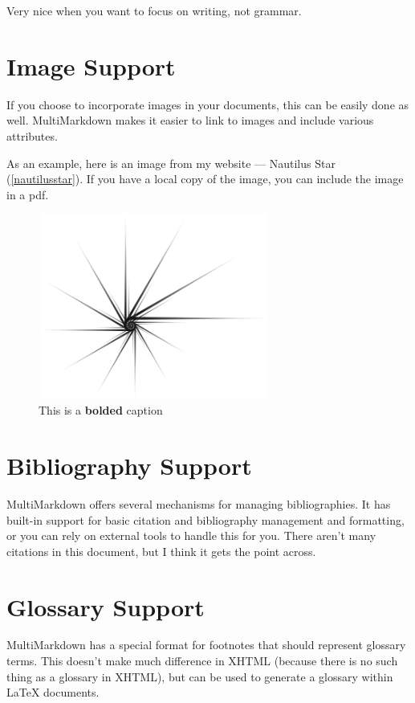 Very nice when you want to focus on writing, not grammar.

\section{Image Support}
\label{imagesupport}

If you choose to incorporate images in your documents, this can be easily done
as well. MultiMarkdown makes it easier to link to images and include various
attributes.

As an example, here is an image from my website --- Nautilus
Star (\autoref{nautilusstar}). If you have a local copy of the image, you can include
the image in a pdf.

\begin{figure}[htbp]
\centering
\includegraphics[width=3in,height=2.4in]{Nautilus_Star.png}
\caption{This is a \textbf{bolded} caption}
\label{nautilusstar}
\end{figure}



\section{Bibliography Support}
\label{bibliographysupport}

MultiMarkdown offers several mechanisms for managing bibliographies. It has
built-in support for basic citation and bibliography management and
formatting, or you can rely on external tools to handle this for you. There
aren't many citations in this document, but I think it gets the point
across.~\citep[p. 42]{fake}

\section{Glossary Support}
\label{glossarysupport}

MultiMarkdown has a special format for footnotes that should represent
glossary terms. This doesn't make much difference in XHTML (because there is
no such thing as a glossary in XHTML), but can be used to generate a glossary
within LaTeX documents.

